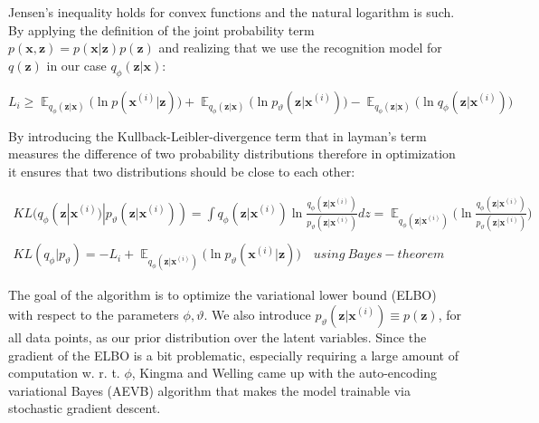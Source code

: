 \documentclass[12pt, english]{article}
\DeclareMathOperator*{\E}{\mathbb{E}}
\begin{document}
\par Jensen's inequality holds for convex functions and the natural logarithm is such. By applying the definition of the joint probability term $p(\bm{x}, \bm{z}) = p(\bm{x} | \bm{z})p(\bm{z})$ and realizing that we use the recognition model for $q(\bm{z})$ in our case $q_{\phi}(\bm{z} | \bm{x})$:

\vspace{4mm}

\begin{equation}
    L_{i} \geq \E_{q_{\phi}(\bm{z} | \bm{x})} \Big( \ln p(\bm{x}^{(i)} | \bm{z}) \Big) + \E_{q_{\phi}(\bm{z} | \bm{x})} \Big( \ln p_{\vartheta}(\bm{z} | \bm{x}^{(i)}) \Big) - \E_{q_{\phi}(\bm{z} | \bm{x})} \Big( \ln q_{\phi}(\bm{z} | \bm{x}^{(i)}) \Big)
\end{equation}

\vspace{4mm}

\par By introducing the Kullback-Leibler-divergence term that in layman's term measures the difference of two probability distributions therefore in optimization it ensures that two distributions should be close to each other:

\vspace{4mm}

\begin{gather*}
    KL(q_{\phi}(\bm{z} | \bm{x}^{(i)}) | p_{\vartheta}(\bm{z} | \bm{x}^{(i)})) = \int q_{\phi}(\bm{z} | \bm{x}^{(i)})\ln \frac{q_{\phi}(\bm{z} | \bm{x}^{(i)})}{p_{\vartheta}(\bm{z} | \bm{x}^{(i)})}dz = \E_{q_{\phi}(\bm{z} | \bm{x}^{(i)})} \Big( \ln \frac{q_{\phi}(\bm{z} | \bm{x}^{(i)})}{p_{\vartheta}(\bm{z}|\bm{x}^{(i)})}  \Big) \\ \\
    KL(q_{\phi} | p_{\vartheta}) = -L_{i} + \E_{q_{\phi}(\bm{z} | \bm{x}^{(i)})} \Big( \ln p_{\vartheta}(\bm{x}^{(i)} | \bm{z}) \Big) \quad using\ Bayes-theorem
\end{gather*}

\vspace{4mm}

\par The goal of the algorithm is to optimize the variational lower bound (ELBO) with respect to the parameters $\phi, \vartheta$. We also introduce $p_{\vartheta}(\bm{z} | \bm{x}^{(i)}) \equiv p(\bm{z})$, for all data points, as our prior distribution over the latent variables. Since the gradient of the ELBO is a bit problematic, especially requiring a large amount of computation w. r. t. $\phi$, Kingma and Welling came up with the auto-encoding variational Bayes (AEVB) algorithm that makes the model trainable via stochastic gradient descent.
\end{document}
